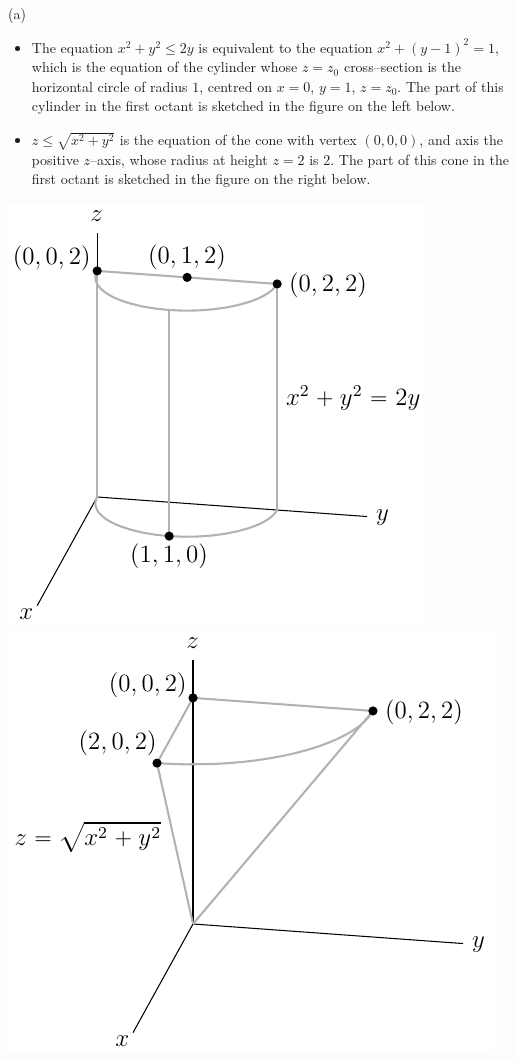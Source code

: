 \begin{solution}
(a) 
\begin{itemize}
\item
The equation $x^2 + y^2 \le 2y$ is equivalent to the
equation $x^2 + (y-1)^2=1$, which is the equation of the cylinder whose
$z=z_0$ cross--section is the horizontal circle of radius $1$, centred on 
$x=0$, $y=1$, $z=z_0$. The part of this cylinder in the first octant is
sketched in the figure on the left below.

\item
$z \le \sqrt{x^2 + y^2}$ is the equation of the cone with vertex $(0,0,0)$,
and axis the positive $z$--axis, whose radius at height $z=2$ is $2$.
The part of this cone in the first octant is sketched in the figure
on the right below.

\end{itemize}

\begin{center}
     \includegraphics{fig/OE05D_8a.pdf}\quad
     \includegraphics{fig/OE05D_8b.pdf}
\end{center}


\end{solution}
